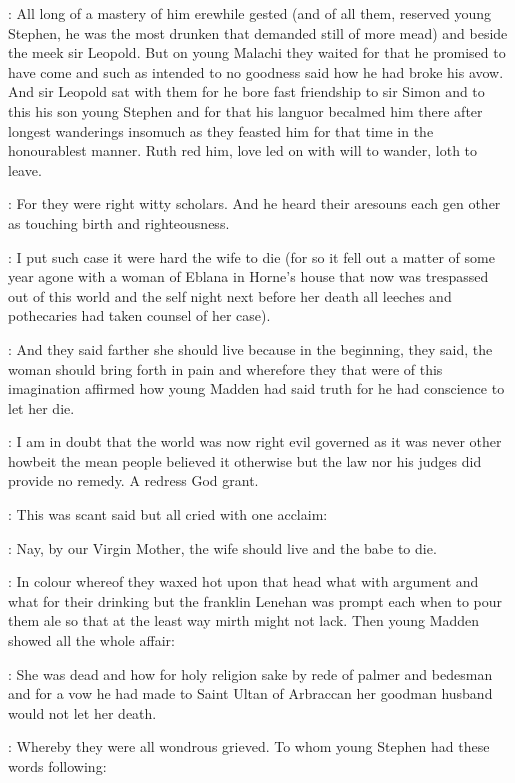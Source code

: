 \documentclass[12pt]{article}
\begin{document}
: All long of a mastery of him erewhile gested
(and of all them, reserved young Stephen, he was the most
drunken that demanded still of more mead) and beside the meek sir
Leopold. But on young Malachi they waited for that he promised to
have come and such as intended to no goodness said how he had broke
his avow. And sir Leopold sat with them for he bore fast friendship
to sir Simon and to this his son young Stephen and for that his languor
becalmed him there after longest wanderings insomuch as they feasted
him for that time in the honourablest manner. Ruth red him, love led
on with will to wander, loth to leave.


: For they were right witty scholars. And he heard their aresouns each
gen other as touching birth and righteousness.

\Md: I put such case it were hard the wife to die (for so it fell out a
matter of some year agone with a woman of Eblana in Horne's house that
now was trespassed out of this world and the self night next before her
death all leeches and pothecaries had taken counsel of her case).

: And they said farther she should live because in the beginning, they
said, the woman should bring forth in pain and wherefore they that were of
this imagination affirmed how young Madden had said truth for he had
conscience to let her die.

\Ly: I am in doubt that the world was now right evil governed as it was
never other howbeit the mean people believed it otherwise but the law nor
his judges did provide no remedy. A redress God grant.

: This was scant said but all cried with one acclaim:

\All: Nay, by our Virgin Mother, the wife should live
and the babe to die.

: In colour whereof they waxed hot upon that head what
with argument and what for their drinking but the franklin Lenehan was
prompt each when to pour them ale so that at the least way mirth might
not lack. Then young Madden showed all the whole affair:

\Md: She was dead and how for holy religion sake by rede of palmer and
bedesman and for a vow he had made to Saint Ultan of Arbraccan her
goodman husband would not let her death.

: Whereby they were all wondrous grieved.
To whom young Stephen had these words following:
\end{document}
